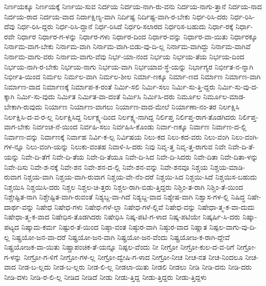 {ನಿರ್ಣಯಕ್ಕೂ
ನಿರ್ಣಯಕ್ಕೆ
ನಿರ್ಣಯಿ-ಸುವ
ನಿರ್ದಯ
ನಿರ್ದಯ-ನಾಗಿ-ರು-ವನು
ನಿರ್ದಯ-ನಾಗು-ತ್ತಾನೆ
ನಿರ್ದಯ-ನಾದ
ನಿರ್ದಯ-ರಾದ
ನಿರ್ದಯ-ವಾದ
ನಿರ್ದಾಕ್ಷಿಣ್ಯ-ವಾಗಿ
ನಿರ್ದಿಷ್ಟ
ನಿರ್ದಿಷ್ಟ-ವಾಗಿ-ರ-ಬೇಕು
ನಿರ್ಧ-ರಿಸಿ-ದರು
ನಿರ್ಧ-ರಿಸಿ-ದೆವು
ನಿರ್ಧ-ರಿಸಿ-ದ್ದರು
ನಿರ್ಧ-ರಿಸಿ-ದ್ದಾನೆ
ನಿರ್ಧ-ರಿಸಿದೆ
ನಿರ್ಧರಿ-ಸಲಾರದ
ನಿರ್ಧರಿಸ-ಬಹುದು
ನಿರ್ಧಾ-ರಕ್ಕೆ
ನಿರ್ಧಾ-ರವೇ
ನಿರ್ಧಾರ
ನಿರ್ಧಾರ-ಗ-ಳನ್ನು
ನಿರ್ಧಾರ-ಗಳು
ನಿರ್ಧಾರ-ದಿಂದ
ನಿರ್ಧಾರ-ವನ್ನು
ನಿರ್ಧಾರ-ವಾ-ಯಿತು
ನಿರ್ಧಾರಕ್ಕೂ
ನಿರ್ನಾಮ-ವಾಗ-ಬೇಕು
ನಿರ್ನಾಮ-ವಾಗಿ
ನಿರ್ನಾಮ-ವಾಗಿ-ಬಿಡು-ವು-ದಿ-ಲ್ಲ
ನಿರ್ನಾಮ-ವಾಗಿದ್ದು
ನಿರ್ನಾಮ-ವಾಗಿವೆ
ನಿರ್ನಾಮ-ವಾಗು-ವರು
ನಿರ್ನಾಮ-ವಾಗು-ವೆವು
ನಿರ್ಭ-ಯಾ-ನಂದ
ನಿರ್ಭಯ
ನಿರ್ಭಯ-ತೆಯ
ನಿರ್ಭಯ-ದಿಂದ
ನಿರ್ಭಯ-ನಾಗಿ-ರ-ಬೇಕು
ನಿರ್ಭಯ-ನಾಗು
ನಿರ್ಭಯ-ವಾಗಿ
ನಿರ್ಭಯಾವ-ಸ್ಥೆ-ಯನ್ನು
ನಿರ್ಭಾಗ್ಯರ
ನಿರ್ಭೀತ-ನ-ನ್ನಾಗಿ
ನಿರ್ಭೀತಿ-ಯಿಂದ
ನಿರ್ಮಲ
ನಿರ್ಮಲ-ವಾಗಿ
ನಿರ್ಮಲ-ಶೀಲ
ನಿರ್ಮಾ-ಣಕ್ಕೂ
ನಿರ್ಮಾ-ಣದ
ನಿರ್ಮಾಣ
ನಿರ್ಮಾಣ-ವಾಗಿ
ನಿರ್ಮಾಣ-ವಾದ
ನಿರ್ಮಾಣಕ್ಕೆ
ನಿರ್ಮಾಪ-ಕ-ರಂತೆ
ನಿರ್ಮಿ-ಸಲಿ
ನಿರ್ಮಿ-ಸಲು
ನಿರ್ಮಿ-ಸು-ತ್ತಿ-ದ್ದರು
ನಿರ್ಮಿ-ಸು-ವು-ದ-ಕ್ಕಾಗಿ
ನಿರ್ಮಿ-ಸು-ವುದು
ನಿರ್ಮಿತ
ನಿರ್ಮಿತ-ವಾ-ದಂತೆ
ನಿರ್ಮಿಸಿ
ನಿರ್ಮಿಸಿ-ದರು
ನಿರ್ಮೂಲ
ನಿರ್ಮೂಲ-ಮಾಡ-ಬೇಕಾಗಿ-ರುವುದು
ನಿರ್ಯಾಣ
ನಿರ್ಯಾಣ-ವಾಗಲು
ನಿರ್ಯಾಣ-ವಾದ-ಮೇಲೆ
ನಿರ್ಯಾಣಾ-ನಂ-ತರ
ನಿರ್ಲಕ್ಷಿಸಿ
ನಿರ್ಲಕ್ಷಿಸಿ-ದ-ವ-ರ-ಲ್ಲ
ನಿರ್ಲಕ್ಷಿಸಿದ್ದ
ನಿರ್ಲಕ್ಷ್ಯ-ದಿಂದ
ನಿರ್ಲಕ್ಷ್ಯ-ನಾಗಿದ್ದ
ನಿರ್ಲಿಪ್ತ
ನಿರ್ಲಿಪ್ತ-ರಾಗ-ತೊಡಗಿದರು
ನಿರ್ಲಿಪ್ತ-ವಾಗ-ಬೇಕು
ನಿರ್ವಂಚ-ನೆ-ಯಿಂದ
ನಿರ್ವಹಿ-ಸಲು
ನಿರ್ವಹಿಸಿ-ಕೊಂಡು
ನಿರ್ವಾ-ಣಕ್ಕೂ
ನಿರ್ವಾಣ
ನಿರ್ವಾಣ-ದ-ಲ್ಲಿ
ನಿರ್ವಾಣ-ವನ್ನು
ನಿರ್ವಾಣಕ್ಕೆ
ನಿರ್ವಾಹ
ನಿರ್ವಿ-ಕ-ಲ್ಪ
ನಿರ್ವಿಷಯ
ನಿಲು-ಕದ
ನಿಲು-ಕದ-ವರು
ನಿಲು-ವಂಗಿ
ನಿಲು-ವಂಗಿ-ಗಳ-ನ್ನೂ
ನಿಲು-ವಂಗಿ-ಯನ್ನು
ನಿಲುಕು-ವಂತಹ
ನಿವಾಳಿ-ಸಿ-ದರು
ನಿವು
ನಿವೃ-ತ್ತ
ನಿವೃ-ತ್ತ-ರಾಗುವ
ನಿವೇ
ನಿವೇ-ದಿ-ತೆ-ಯನ್ನು
ನಿವೇ-ದಿ-ತೆಗೆ
ನಿವೇ-ದಿ-ತೆಯ
ನಿವೇ-ದಿ-ತೆಯೂ
ನಿವೇ-ದಿ-ಸಿದ
ನಿವೇ-ದಿ-ಸಿದರು
ನಿವೇ-ದಿತಾ
ನಿವೇ-ದಿತಾ-ಳನ್ನು
ನಿವೇ-ದಿಸು
ನಿವೇ-ಶ-ನಕ್ಕೆ
ನಿವೇ-ಶನ
ನಿವೇ-ಶನ-ದ-ಲ್ಲಿ
ನಿವೇ-ಶನ-ವನ್ನು
ನಿವೇ-ಶನವೂ
ನಿಶ್ಚಯ
ನಿಶ್ಚಯ-ಮಾಡಿ-ರುವಾಗ
ನಿಶ್ಚಯ-ವಾಗಿ
ನಿಶ್ಚಯ-ವಾಗಿ-ರುವಾಗ
ನಿಶ್ಚಯ-ವೇ-ನೆಂ-ದರೆ
ನಿಶ್ಚಯಿ-ಸಿದ
ನಿಶ್ಚಯಿ-ಸಿದೆ
ನಿಶ್ಚಯಿಸ-ಬಹುದು
ನಿಶ್ಚಯಿಸಿ
ನಿಶ್ಚಯಿಸಿ-ದರು
ನಿಶ್ಚಲ
ನಿಶ್ಚಲ-ಚಿ-ತ್ತರು
ನಿಶ್ಚಲ-ರಾಗಿ-ಬಿಡು-ತ್ತಿದ್ದರು
ನಿಶ್ಚಿಂ-ತ-ರಾಗಿ
ನಿಶ್ಚಿಂ-ತೆ-ಯಿಂದ
ನಿಶ್ಚೇಷ್ಟಿತ-ನಾಗಿ
ನಿಶ್ಚೇಷ್ಟಿತ-ವಾಗಿ-ರುವಂತೆ
ನಿಶ್ಯಬ್ದ-ವಾ-ಗಿದೆ
ನಿಶ್ಯಬ್ದ-ವಾದ
ನಿಶ್ಯೇಷ-ವಾಗಿ
ನಿಶ್ವಾಸ-ಗಳ-ಲ್ಲಿ
ನಿಷಿದ್ಧ
ನಿಷೇ-ದಾರ್ಥ-ವನ್ನು
ನಿಷೇಧ
ನಿಷೇಧ-ಗಳು
ನಿಷೇಧ-ಗಳೆ-ಲ್ಲಾ
ನಿಷೇಧ-ಗಳೆ-ಲ್ಲಿವೆ
ನಿಷೇಧ-ವನ್ನು
ನಿಷೇಧಾ-ತ್ಮ-ಕ-ವಾ-ದುದು
ನಿಷೇಧಾ-ತ್ಮ-ಕ-ವಾದ
ನಿಷೇಧಿಸ-ತೊಡಗಿದರು
ನಿಷೇಧಿಸಿ
ನಿಷ್ಕ-ಪಟಿ-ಗ-ಳಾದ
ನಿಷ್ಕ-ಪಟಿಯೇ
ನಿಷ್ಕರ್ಷಿ-ಸಿ-ದರು
ನಿಷ್ಕಾ-ಪಟ್ಯದ
ನಿಷ್ಕಾಮ-ಕರ್ಮ
ನಿಷ್ಟುರ-ತೆ-ಯಿಂದ
ನಿಷ್ಠಾ-ವಂತ
ನಿಷ್ಠುರ-ವಾಗಿ
ನಿಷ್ಠುರ-ವಾದ
ನಿಷ್ಣಾತ
ನಿಷ್ಪಲ-ವಾಗು-ವು-ದಿ-ಲ್ಲ
ನಿಷ್ಪ್ರಯೋ-ಜನ-ವಾ-ದರೆ
ನಿಷ್ಪ್ರಯೋ-ಜನ-ವಾಗಿ
ನಿಷ್ಪ್ರಯೋ-ಜನ-ವೆಂದು
ನಿಷ್ಪ್ರಯೋಜ-ಕ-ರಾಗಿ-ದ್ದೇವೆ
ನಿಷ್ಪ್ರಯೋಜಕ-ವಾ-ಯಿತು
ನಿಷ್ಪ್ರಾಪಂಚಿಕ-ತೆ-ಯನ್ನೂ
ನಿಷ್ಫಲ-ವೆಂದು
ನೀ
ನೀಗ್ರೋ
ನೀಗ್ರೋ-ಕುಲ-ದ-ವ-ರಿಗೆ
ನೀಗ್ರೋ-ಗ-ಳನ್ನು
ನೀಗ್ರೋ-ಗ-ಳಿಗೆ
ನೀಗ್ರೋ-ಗಳ-ಲ್ಲ
ನೀಗ್ರೋ-ದ್ವೇಷಿ-ಗ-ಳಾದ
ನೀಗ್ರೋ-ನೀಚ
ನೀಚ-ನತ
ನೀಚ-ನಿಂದಲೂ
ನೀಚ-ವಾದ
ನೀಡ-ಬ-ಲ್ಲದು
ನೀಡ-ಬ-ಲ್ಲರು
ನೀಡ-ಲಿ-ಲ್ಲ
ನೀಡಲಾ-ಯಿತು
ನೀಡಲಿ
ನೀಡಲು
ನೀಡಿ
ನೀಡಿ-ದನು
ನೀಡಿ-ದರು
ನೀಡಿ-ದಳು
ನೀಡಿ-ರ-ಲಿ-ಲ್ಲ
ನೀಡಿದ
ನೀಡಿದೆ
ನೀಡು
ನೀಡು-ತ್ತಿದ್ದ
ನೀಡು-ತ್ತಿದ್ದರು
ನೀಡು-ತ್ತಿದ್ದಳು
}
